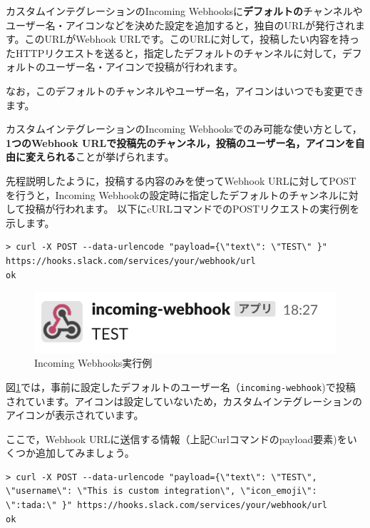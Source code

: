 \documentclass[uplatex,a4j]{jsarticle}
\begin{document}
カスタムインテグレーションのIncoming Webhooksに\textbf{デフォルトの}チャンネルやユーザー名・アイコンなどを決めた設定を追加すると，独自のURLが発行されます。このURLがWebhook URLです。このURLに対して，投稿したい内容を持ったHTTPリクエストを送ると，指定したデフォルトのチャンネルに対して，デフォルトのユーザー名・アイコンで投稿が行われます。


なお，このデフォルトのチャンネルやユーザー名，アイコンはいつでも変更できます。

\clearpage
カスタムインテグレーションのIncoming Webhooksでのみ可能な使い方として，\textbf{1つのWebhook URLで投稿先のチャンネル，投稿のユーザー名，アイコンを自由に変えられる}ことが挙げられます。

先程説明したように，投稿する内容のみを使ってWebhook URLに対してPOSTを行うと，Incoming Webhookの設定時に指定したデフォルトのチャンネルに対して投稿が行われます。
以下にcURLコマンドでのPOSTリクエストの実行例を示します。

\begin{lstlisting}[basicstyle=\ttfamily\footnotesize,language=command.com,frame=single,caption=Curl sample]
> curl -X POST --data-urlencode "payload={\"text\": \"TEST\" }" https://hooks.slack.com/services/your/webhook/url
ok
\end{lstlisting}

\begin{figure}[h]
 \centering
 \includegraphics[keepaspectratio, scale=0.8]{images/webhook_sample2.png}
 \caption{Incoming Webhooks実行例}
 \label{fig:webhook_sample2}
\end{figure}

図\ref{fig:webhook_sample2}では，事前に設定したデフォルトのユーザー名（\verb|incoming-webhook|)で投稿されています。アイコンは設定していないため，カスタムインテグレーションのアイコンが表示されています。

ここで，Webhook URLに送信する情報（上記Curlコマンドのpayload要素)をいくつか追加してみましょう。

\begin{lstlisting}[basicstyle=\ttfamily\footnotesize,language=command.com,frame=single,caption=Curl sample2]
> curl -X POST --data-urlencode "payload={\"text\": \"TEST\", \"username\": \"This is custom integration\", \"icon_emoji\": \":tada:\" }" https://hooks.slack.com/services/your/webhook/url
ok
\end{lstlisting}
\end{document}

